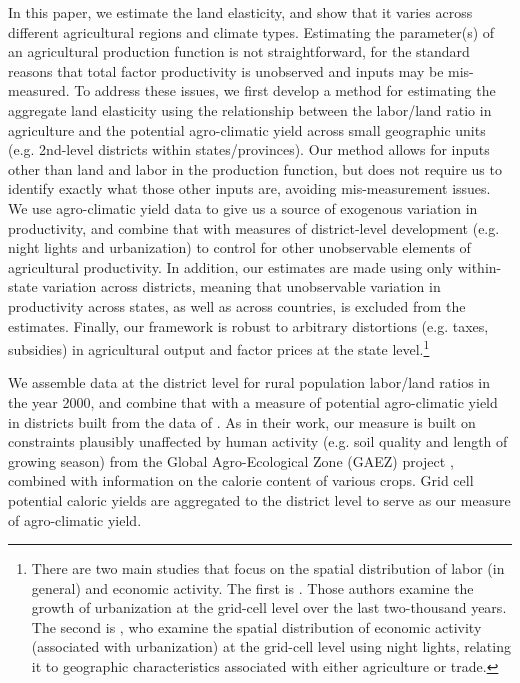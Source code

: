 \documentclass[11pt]{article}
\begin{document}
In this paper, we estimate the land elasticity, and show that it varies across different agricultural regions and climate types. Estimating the parameter(s) of an agricultural production function is not straightforward, for the standard reasons that total factor productivity is unobserved and inputs may be mis-measured. To address these issues, we first develop a method for estimating the aggregate land elasticity using the relationship between the labor/land ratio in agriculture and the potential agro-climatic yield across small geographic units (e.g. 2nd-level districts within states/provinces). Our method allows for inputs other than land and labor in the production function, but does not require us to identify exactly what those other inputs are, avoiding mis-measurement issues. We use agro-climatic yield data to give us a source of exogenous variation in productivity, and combine that with measures of district-level development (e.g. night lights and urbanization) to control for other unobservable elements of agricultural productivity. In addition, our estimates are made using only within-state variation across districts, meaning that unobservable variation in productivity across states, as well as across countries, is excluded from the estimates. Finally, our framework is robust to arbitrary distortions (e.g. taxes, subsidies) in agricultural output and factor prices at the state level.\footnote{There are two main studies that focus on the spatial distribution of labor (in general) and economic activity. The first is \citet{mfm2014}. Those authors examine the growth of urbanization at the grid-cell level over the last two-thousand years. The second is \citet{hssw2016}, who examine the spatial distribution of economic activity (associated with urbanization) at the grid-cell level using night lights, relating it to geographic characteristics associated with either agriculture or trade.} 

We assemble data at the district level for rural population labor/land ratios in the year 2000, and combine that with a measure of potential agro-climatic yield in districts built from the data of \citet{galorozak2016}. As in their work, our measure is built on constraints plausibly unaffected by human activity (e.g. soil quality and length of growing season) from the Global Agro-Ecological Zone (GAEZ) project \citep{gaez}, combined with information on the calorie content of various crops. Grid cell potential caloric yields are aggregated to the district level to serve as our measure of agro-climatic yield.
\end{document}

